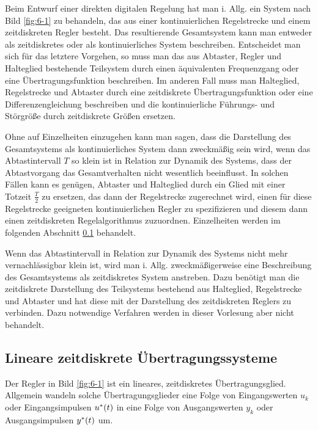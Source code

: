 Beim Entwurf einer direkten digitalen Regelung hat man i. Allg. ein System nach Bild \ref{fig:6-1} zu behandeln, das aus einer kontinuierlichen Regelstrecke und einem zeitdiskreten Regler besteht.
Das resultierende Gesamtsystem kann man entweder als zeitdiskretes oder als kontinuierliches System beschreiben.
Entscheidet man sich für das letztere Vorgehen, so muss man das aus Abtaster, Regler und Halteglied bestehende Teilsystem durch einen äquivalenten Frequenzgang oder eine Übertragungsfunktion beschreiben.
Im anderen Fall muss man Halteglied, Regelstrecke und Abtaster durch eine zeitdiskrete Übertragungsfunktion oder eine Differenzengleichung beschreiben und die kontinuierliche Führungs- und Störgröße durch zeitdiskrete Größen ersetzen.

Ohne auf Einzelheiten einzugehen kann man sagen, dass die Darstellung des Gesamtsystems als kontinuierliches System dann zweckmäßig sein wird, wenn das Abtastintervall \(T\) so klein ist in Relation zur Dynamik des Systems, dass der Abtastvorgang das Gesamtverhalten nicht wesentlich beeinflusst.
In solchen Fällen kann es genügen, Abtaster und Halteglied durch ein Glied mit einer Totzeit \(\frac{T}{2}\) zu ersetzen, das dann der Regelstrecke zugerechnet wird, einen für diese Regelstrecke geeigneten kontinuierlichen Regler zu spezifizieren und diesem dann einen zeitdiskreten Regelalgorithmus zuzuordnen.
Einzelheiten werden im folgenden Abschnitt \ref{sec:6-2} behandelt.

Wenn das Abtastintervall in Relation zur Dynamik des Systems nicht mehr vernachlässigbar klein ist, wird man i. Allg. zweckmäßigerweise eine Beschreibung des Gesamtsystems als zeitdiskretes System anstreben.
Dazu benötigt man die zeitdiskrete Darstellung des Teilsystems bestehend aus Halteglied, Regelstrecke und Abtaster und hat diese mit der Darstellung des zeitdiskreten Reglers zu verbinden.
Dazu notwendige Verfahren werden in dieser Vorlesung aber nicht behandelt.


\subsection{Lineare zeitdiskrete Übertragungssysteme}\label{sec:6-2}

Der Regler in Bild \ref{fig:6-1} ist ein lineares, zeitdiskretes Übertragungsglied.
Allgemein wandeln solche Übertragungsglieder eine Folge von Eingangswerten \(u_k\) oder Eingangsimpulsen \(u^*\parentheses*{t}\) in eine Folge von Ausgangswerten \(y_k\) oder Ausgangsimpulsen \(y^*\parentheses*{t}\) um.

